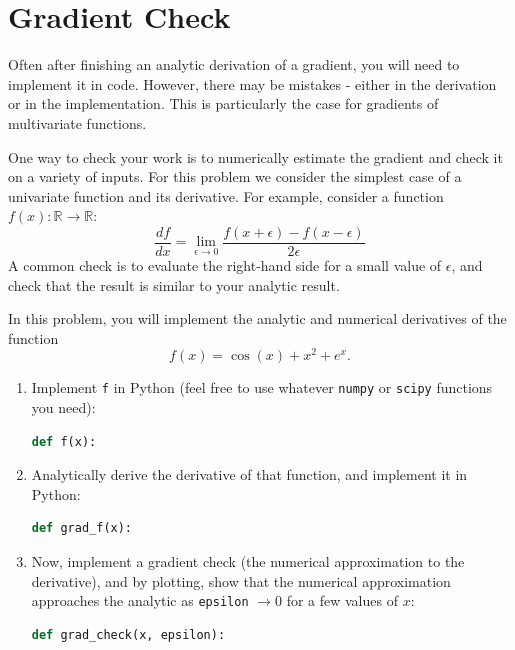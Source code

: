 \documentclass[submit]{harvardml}
\begin{document}
\section*{Gradient Check}
\begin{problem}
  Often after finishing an analytic derivation of a gradient, you will
  need to implement it in code.  However, there may be mistakes -
  either in the derivation or in the implementation. This is
  particularly the case for gradients of multivariate functions.

  \air

  \noindent One way to check your work is to numerically estimate the gradient
  and check it on a variety of inputs. For this problem we consider
  the simplest case of a univariate function and its derivative.  For
  example, consider a function $f(x): \mathbb{R} \to \mathbb{R}$:
$$\frac{d f}{d x} = \underset{\epsilon \to 0} \lim \frac{f(x + \epsilon) - f(x - \epsilon)}{2 \epsilon}$$
\noindent A common check is to evaluate the right-hand side for a small value of
$\epsilon$, and check that the result is similar to your analytic
result.\\

\smallskip

\noindent In this problem, you will implement the analytic and numerical derivatives of the function \[f(x) = \cos(x) + x^2 + e^x.\]

\begin{enumerate}
  \item Implement \texttt{f} in Python (feel free to use whatever \texttt{numpy} or \texttt{scipy} functions you need):
  \begin{lstlisting}[language=python]
  def f(x):

  \end{lstlisting}
  \item Analytically derive the derivative of that function, and implement it in Python:
  \begin{lstlisting}[language=python]
  def grad_f(x):
  \end{lstlisting}
  \item Now, implement a gradient check (the numerical approximation to the derivative), and by plotting, 
        show that the numerical approximation approaches the analytic as \texttt{epsilon} 
        $\to 0$ for a few values of $x$:
  \begin{lstlisting}[language=python]
  def grad_check(x, epsilon):

  \end{lstlisting}
\end{enumerate}
\end{problem}
\end{document}

